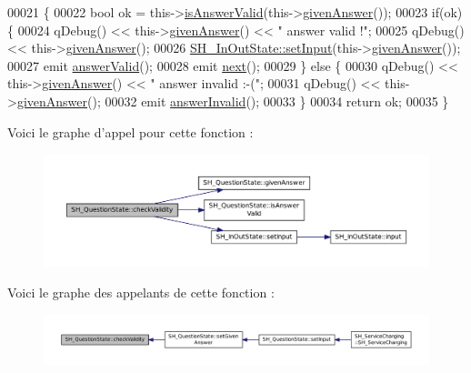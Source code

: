 \begin{DoxyCode}
00021 \{
00022     \textcolor{keywordtype}{bool} ok = this->\hyperlink{classSH__QuestionState_ac195d7ad87a52ab276a7c4a902eab691}{isAnswerValid}(this->\hyperlink{classSH__QuestionState_abde97c61175be95358ece622fd16593e}{givenAnswer}());
00023     \textcolor{keywordflow}{if}(ok) \{
00024         qDebug() << this->\hyperlink{classSH__QuestionState_abde97c61175be95358ece622fd16593e}{givenAnswer}() << \textcolor{stringliteral}{" answer valid !"};
00025         qDebug() << this->\hyperlink{classSH__QuestionState_abde97c61175be95358ece622fd16593e}{givenAnswer}();
00026         \hyperlink{classSH__InOutState_a0206ab7d5616f28b0da7bfd5451614e8}{SH\_InOutState::setInput}(this->\hyperlink{classSH__QuestionState_abde97c61175be95358ece622fd16593e}{givenAnswer}());
00027         emit \hyperlink{classSH__QuestionState_a04e259643788d15ab6244bc8a04286d6}{answerValid}();
00028         emit \hyperlink{classSH__GenericState_a030e67a872956135c52e6876d960a7b5}{next}();
00029     \} \textcolor{keywordflow}{else} \{
00030         qDebug() << this->\hyperlink{classSH__QuestionState_abde97c61175be95358ece622fd16593e}{givenAnswer}() << \textcolor{stringliteral}{" answer invalid :-("};
00031         qDebug() << this->\hyperlink{classSH__QuestionState_abde97c61175be95358ece622fd16593e}{givenAnswer}();
00032         emit \hyperlink{classSH__QuestionState_a3348a8a683130678ac87a10ba2a25486}{answerInvalid}();
00033     \}
00034     \textcolor{keywordflow}{return} ok;
00035 \}
\end{DoxyCode}


Voici le graphe d'appel pour cette fonction \-:\nopagebreak
\begin{figure}[H]
\begin{center}
\leavevmode
\includegraphics[width=350pt]{classSH__QuestionState_a3ca5459c20ef591023c0572d8224146c_cgraph}
\end{center}
\end{figure}




Voici le graphe des appelants de cette fonction \-:\nopagebreak
\begin{figure}[H]
\begin{center}
\leavevmode
\includegraphics[width=350pt]{classSH__QuestionState_a3ca5459c20ef591023c0572d8224146c_icgraph}
\end{center}
\end{figure}


